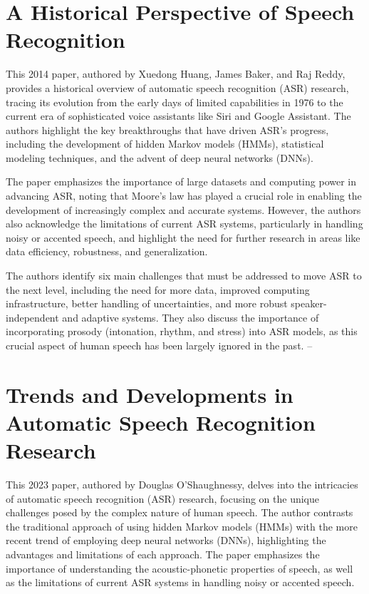 \section{A Historical Perspective of Speech Recognition}

This 2014 paper, authored by Xuedong Huang, James Baker, and Raj Reddy, provides a historical overview of automatic speech recognition (ASR) research, tracing its evolution from the early days of limited capabilities in 1976 to the current era of sophisticated voice assistants like Siri and Google Assistant. The authors highlight the key breakthroughs that have driven ASR's progress, including the development of hidden Markov models (HMMs), statistical modeling techniques, and the advent of deep neural networks (DNNs).

The paper emphasizes the importance of large datasets and computing power in advancing ASR, noting that Moore's law has played a crucial role in enabling the development of increasingly complex and accurate systems. However, the authors also acknowledge the limitations of current ASR systems, particularly in handling noisy or accented speech, and highlight the need for further research in areas like data efficiency, robustness, and generalization.

The authors identify six main challenges that must be addressed to move ASR to the next level, including the need for more data, improved computing infrastructure, better handling of uncertainties, and more robust speaker-independent and adaptive systems. They also discuss the importance of incorporating prosody (intonation, rhythm, and stress) into ASR models, as this crucial aspect of human speech has been largely ignored in the past.
--

\section{Trends and Developments in Automatic Speech Recognition Research}

This 2023 paper, authored by Douglas O'Shaughnessy, delves into the intricacies of automatic speech recognition (ASR) research, focusing on the unique challenges posed by the complex nature of human speech. The author contrasts the traditional approach of using hidden Markov models (HMMs) with the more recent trend of employing deep neural networks (DNNs), highlighting the advantages and limitations of each approach. The paper emphasizes the importance of understanding the acoustic-phonetic properties of speech, as well as the limitations of current ASR systems in handling noisy or accented speech.

